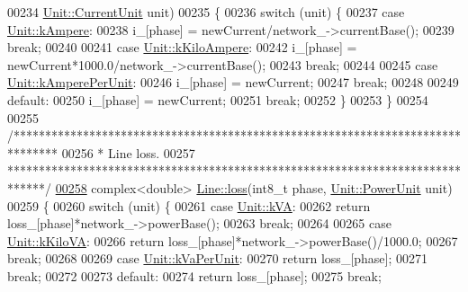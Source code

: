 \begin{DoxyCode}
00234                 \hyperlink{class_unit_a0794cf6c9682f48296dd4a5315389787}{Unit::CurrentUnit} unit)
00235 \{
00236   \textcolor{keywordflow}{switch} (unit) \{
00237   \textcolor{keywordflow}{case} \hyperlink{class_unit_a0794cf6c9682f48296dd4a5315389787a368a3c470f0b590a6100dda717a7dd4f}{Unit::kAmpere}:
00238     i\_[phase] = newCurrent/network\_->currentBase();
00239     \textcolor{keywordflow}{break};
00240 
00241   \textcolor{keywordflow}{case} \hyperlink{class_unit_a0794cf6c9682f48296dd4a5315389787aa27cb5edd73099f24f2285e02396ae14}{Unit::kKiloAmpere}:
00242     i\_[phase] = newCurrent*1000.0/network\_->currentBase();
00243     \textcolor{keywordflow}{break};
00244 
00245   \textcolor{keywordflow}{case} \hyperlink{class_unit_a0794cf6c9682f48296dd4a5315389787aeed3b50e464d581cb630181a3b6a0709}{Unit::kAmperePerUnit}:
00246     i\_[phase] = newCurrent;
00247     \textcolor{keywordflow}{break};
00248 
00249   \textcolor{keywordflow}{default}:
00250     i\_[phase] = newCurrent;
00251     \textcolor{keywordflow}{break};
00252   \}
00253 \}
00254 
00255 \textcolor{comment}{/*******************************************************************************}
00256 \textcolor{comment}{ * Line loss.}
00257 \textcolor{comment}{ ******************************************************************************/}
\hypertarget{line_8cpp_source_l00258}{}\hyperlink{group___models_ga511d4e89d613d4f222480476f2da3abe}{00258} complex<double> \hyperlink{group___models_ga511d4e89d613d4f222480476f2da3abe}{Line::loss}(int8\_t phase, \hyperlink{class_unit_ace265ae255370ccacfd5370337572c3b}{Unit::PowerUnit} unit)
00259 \{
00260   \textcolor{keywordflow}{switch} (unit) \{
00261   \textcolor{keywordflow}{case} \hyperlink{class_unit_ace265ae255370ccacfd5370337572c3ba72b181a842ae2759488a2fa1410d3696}{Unit::kVA}:
00262     \textcolor{keywordflow}{return} loss\_[phase]*network\_->powerBase();
00263     \textcolor{keywordflow}{break};
00264 
00265   \textcolor{keywordflow}{case} \hyperlink{class_unit_ace265ae255370ccacfd5370337572c3bac9e5154522fbb810d7aed75c3ff47cb2}{Unit::kKiloVA}:
00266     \textcolor{keywordflow}{return} loss\_[phase]*network\_->powerBase()/1000.0;
00267     \textcolor{keywordflow}{break};
00268 
00269   \textcolor{keywordflow}{case} \hyperlink{class_unit_ace265ae255370ccacfd5370337572c3bae056e80d620a87c61a44c359e6b05cc1}{Unit::kVaPerUnit}:
00270     \textcolor{keywordflow}{return} loss\_[phase];
00271     \textcolor{keywordflow}{break};
00272 
00273   \textcolor{keywordflow}{default}:
00274     \textcolor{keywordflow}{return} loss\_[phase];
00275     \textcolor{keywordflow}{break};

\end{DoxyCode}
